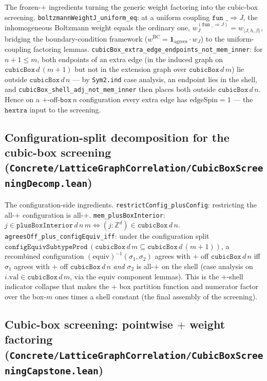 \documentclass[a4paper,11pt]{article}
\begin{document}
The frozen-$+$ ingredients turning the generic weight factoring into the cubic-box
screening. \texttt{boltzmannWeightJ\_uniform\_eq}: at a uniform coupling
$\texttt{fun \_} \Rightarrow J$, the inhomogeneous Boltzmann weight equals the
ordinary one, $w_J^{(\texttt{fun \_}\Rightarrow J)} = w_{\langle J,h,\beta\rangle}$,
bridging the boundary-condition framework
($w^{\mathrm{BC}} = \mathbf{1}_{\mathrm{agrees}} \cdot w_J$) to the
uniform-coupling factoring lemmas.
\texttt{cubicBox\_extra\_edge\_endpoints\_not\_mem\_inner}: for $n+1 \le m$, both
endpoints of an extra edge (in the induced graph on $\texttt{cubicBox}\,d\,(m+1)$
but not in the extension graph over $\texttt{cubicBox}\,d\,m$) lie outside
$\texttt{cubicBox}\,d\,n$ --- by \texttt{Sym2.ind} case analysis, an endpoint lies
in the shell, and \texttt{cubicBox\_shell\_adj\_not\_mem\_inner} then places both
outside $\texttt{cubicBox}\,d\,n$. Hence on a $+$-off-$\texttt{box}\,n$
configuration every extra edge has $\mathrm{edgeSpin} = 1$ --- the $\texttt{hextra}$
input to the screening.

\subsection{Configuration-split decomposition for the cubic-box screening
(\texttt{Concrete/LatticeGraphCorrelation/CubicBoxScreeningDecomp.lean})}

The configuration-side ingredients. \texttt{restrictConfig\_plusConfig}:
restricting the all-$+$ configuration is all-$+$. \texttt{mem\_plusBoxInterior}:
$j \in \texttt{plusBoxInterior}\,d\,n\,m \iff (j : \mathbb Z^d) \in
\texttt{cubicBox}\,d\,n$. \texttt{agreesOff\_plus\_configEquiv\_iff}: under the
configuration split $\texttt{configEquivSubtypeProd}\,(\texttt{cubicBox}\,d\,m
\subseteq \texttt{cubicBox}\,d\,(m+1))$, a recombined configuration
$(\mathrm{equiv})^{-1}(\sigma_1, \sigma_2)$ agrees with $+$ off
$\texttt{cubicBox}\,d\,n$ iff $\sigma_1$ agrees with $+$ off
$\texttt{cubicBox}\,d\,n$ \emph{and} $\sigma_2$ is all-$+$ on the shell (case
analysis on $i.\mathrm{val} \in \texttt{cubicBox}\,d\,m$, via the equiv component
lemmas). This is the $+$-shell indicator collapse that makes the $+$ box partition
function and numerator factor over the box-$m$ ones times a shell constant (the
final assembly of the screening).

\subsection{Cubic-box screening: pointwise $+$ weight factoring
(\texttt{Concrete/LatticeGraphCorrelation/CubicBoxScreeningCapstone.lean})}
\end{document}
